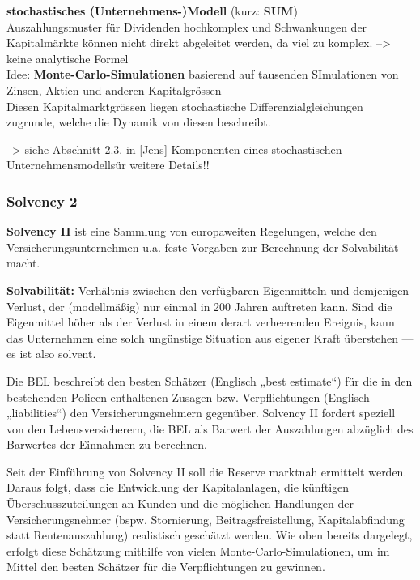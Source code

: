 \documentclass[
]{article}
\begin{document}
\textbf{stochastisches (Unternehmens-)Modell} (kurz: \textbf{SUM})\\
Auszahlungsmuster für Dividenden hochkomplex und Schwankungen der
Kapitalmärkte können nicht direkt abgeleitet werden, da viel zu komplex.
--\textgreater{} keine analytische Formel\\
Idee: \textbf{Monte-Carlo-Simulationen} basierend auf tausenden
SImulationen von Zinsen, Aktien und anderen Kapitalgrössen\\
Diesen Kapitalmarktgrössen liegen stochastische Differenzialgleichungen
zugrunde, welche die Dynamik von diesen beschreibt.

--\textgreater{} siehe Abschnitt 2.3. in {[}Jens{]} Komponenten eines
stochastischen Unternehmensmodellsür weitere Details!!

\hypertarget{solvency-2}{%
\subsubsection{Solvency 2}\label{solvency-2}}

\textbf{Solvency II} ist eine Sammlung von europaweiten Regelungen,
welche den Versicherungsunternehmen u.a. feste Vorgaben zur Berechnung
der Solvabilität macht.

\textbf{Solvabilität:} Verhältnis zwischen den verfügbaren Eigenmitteln
und demjenigen Verlust, der (modellmäßig) nur einmal in 200 Jahren
auftreten kann. Sind die Eigenmittel höher als der Verlust in einem
derart verheerenden Ereignis, kann das Unternehmen eine solch ungünstige
Situation aus eigener Kraft überstehen --- es ist also solvent.

Die BEL beschreibt den besten Schätzer (Englisch „best estimate``) für
die in den bestehenden Policen enthaltenen Zusagen bzw. Verpflichtungen
(Englisch „liabilities``) den Versicherungsnehmern gegenüber. Solvency
II fordert speziell von den Lebensversicherern, die BEL als Barwert der
Auszahlungen abzüglich des Barwertes der Einnahmen zu berechnen.

Seit der Einführung von Solvency II soll die Reserve marktnah ermittelt
werden. Daraus folgt, dass die Entwicklung der Kapitalanlagen, die
künftigen Überschusszuteilungen an Kunden und die möglichen Handlungen
der Versicherungsnehmer (bspw. Stornierung, Beitragsfreistellung,
Kapitalabfindung statt Rentenauszahlung) realistisch geschätzt werden.
Wie oben bereits dargelegt, erfolgt diese Schätzung mithilfe von vielen
Monte-Carlo-Simulationen, um im Mittel den besten Schätzer für die
Verpflichtungen zu gewinnen.
\end{document}
